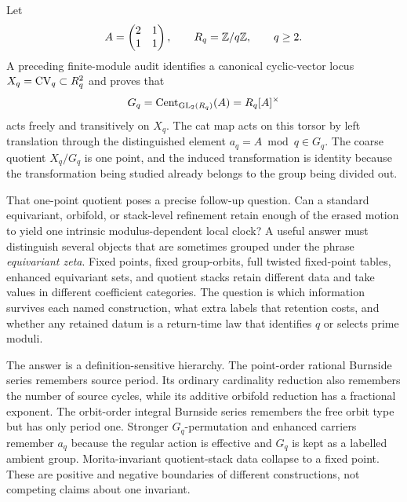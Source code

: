\documentclass[11pt]{article}
\theoremstyle{definition}
\theoremstyle{remark}
\begin{document}
Let
\begin{equation}
  A=\begin{pmatrix}2&1\\1&1\end{pmatrix},
  \qquad R_q=\mathbb{Z}/q\mathbb{Z},
  \qquad q\ge2.
  \label{eq:cat-matrix}
\end{equation}
A preceding finite-module audit identifies a canonical cyclic-vector locus
\(X_q=\mathrm{CV}_q\subset R_q^2\) and proves that
\begin{equation}
  G_q=\operatorname{Cent}_{\operatorname{GL}_2(R_q)}(A)=R_q[A]^\times
  \label{eq:centralizer}
\end{equation}
acts freely and transitively on \(X_q\).  The cat map acts on this torsor by
left translation through the distinguished element
\(a_q=A\bmod q\in G_q\).  The coarse quotient \(X_q/G_q\) is one point, and
the induced transformation is identity because the transformation being
studied already belongs to the group being divided out.

That one-point quotient poses a precise follow-up question.  Can a standard
equivariant, orbifold, or stack-level refinement retain enough of the erased
motion to yield one intrinsic modulus-dependent local clock?  A useful
answer must distinguish several objects that are sometimes grouped under
the phrase \emph{equivariant zeta}.  Fixed points, fixed group-orbits, full
twisted fixed-point tables, enhanced equivariant sets, and quotient stacks
retain different data and take values in different coefficient categories.
The question is which information survives each named construction, what
extra labels that retention costs, and whether any retained datum is a
return-time law that identifies \(q\) or selects prime moduli.

The answer is a definition-sensitive hierarchy.  The point-order rational
Burnside series remembers source period.  Its ordinary cardinality reduction
also remembers the number of source cycles, while its additive orbifold
reduction has a fractional exponent.  The orbit-order integral Burnside
series remembers the free orbit type but has only period one.  Stronger
\(G_q\)-permutation and enhanced carriers remember \(a_q\) because the
regular action is effective and \(G_q\) is kept as a labelled ambient group.
Morita-invariant quotient-stack data collapse to a fixed point.  These are
positive and negative boundaries of different constructions, not competing
claims about one invariant.
\end{document}
